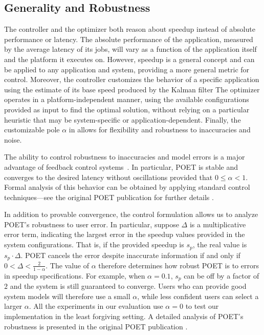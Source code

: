 \subsection{Generality and Robustness}

The controller and the optimizer both reason about speedup instead of absolute performance or latency.
The absolute performance of the application, measured by the average latency of its jobs, will vary as a function of the application itself and the platform it executes on.
However, speedup is a general concept and can be applied to any application and system, providing a more general metric for control.
Moreover, the controller customizes the behavior of a specific application using the estimate of its base speed produced by the Kalman filter
The optimizer operates in a platform-independent manner, using the available configurations provided as input to find the optimal solution, without relying on a particular heuristic that may be system-specific or application-dependent.
Finally, the customizable pole $\alpha$ in  allows for flexibility and robustness to inaccuracies and noise.

The ability to control robustness to inaccuracies and model errors is a major advantage of feedback control systems~\cite{ICSE2014}.
In particular, POET is stable and converges to the desired latency without oscillations provided that $0 \le \alpha < 1$.
Formal analysis of this behavior can be obtained by applying standard control techniques---see the original POET publication for further details \cite{POET}.

In addition to provable convergence, the control formulation allows us to analyze POET's robustness to user error.
In particular, suppose $\Delta$ is a multiplicative error term, indicating the largest error in the speedup values provided in the system configurations.
That is, if the provided speedup is $s_p$, the real value is $s_p \cdot \Delta$.
POET cancels the error despite inaccurate information if and only if $0 < \Delta < \frac{2}{1-\alpha}$.
The value of $\alpha$ therefore determines how robust POET is to errors in speedup specifications.
For example, when $\alpha = 0.1$, $s_p$ can be off by a factor of $2$ and the system is still guaranteed to converge.
Users who can provide good system models will therefore use a small $\alpha$, while less confident users can select a larger $\alpha$.
All the experiments in our evaluation use $\alpha=0$ to test our implementation in the least forgiving setting.
A detailed analysis of POET's robustness is presented in the original POET publication \cite{POET}.
